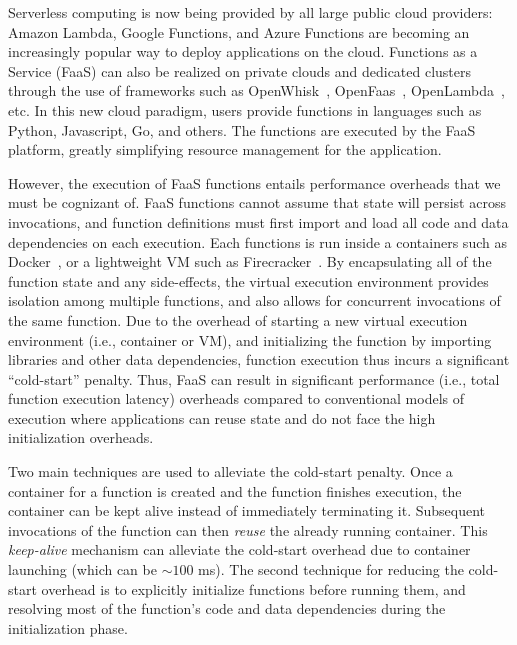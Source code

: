 
Serverless computing is now being provided by all large public cloud providers: Amazon Lambda, Google Functions, and Azure Functions are becoming an increasingly popular way to deploy applications on the cloud.  
Functions as a Service (FaaS) can also be realized on private clouds and dedicated clusters through the use of frameworks such as OpenWhisk~\cite{openwhisk}, OpenFaas~\cite{openfaas}, OpenLambda~\cite{hendrickson2016serverless}, etc. 
%
In this new cloud paradigm, users provide functions in languages such as Python, Javascript, Go, and others. 
%
The functions are executed by the FaaS platform, greatly simplifying resource management for the application. 





However, the execution of FaaS functions entails performance overheads that we must be cognizant of. 
%
%
FaaS functions cannot assume that state will persist across invocations, and function definitions must first import and load all code and data dependencies on each execution. 
%
Each functions is run inside a containers such as Docker~\cite{docker-main}, or a lightweight VM such as Firecracker~\cite{firecracker-nsdi20}. 
By encapsulating all of the function state and any side-effects, the virtual execution environment provides isolation among multiple functions, and also allows for concurrent invocations of the same function. 
%
Due to the overhead of starting a new virtual execution environment (i.e., container or VM), and initializing the function by importing libraries and other data dependencies, function execution thus incurs a significant ``cold-start'' penalty. 
%
Thus, FaaS can result in significant performance (i.e., total function execution latency) overheads compared to conventional models of execution where applications can reuse state and do not face the high initialization overheads. 


Two main techniques are used to alleviate the cold-start penalty. 
Once a container for a function is created and the function finishes execution, the container can be kept alive instead of immediately terminating it. 
Subsequent invocations of the function can then \emph{reuse} the already running container.
This \emph{keep-alive} mechanism can alleviate the cold-start overhead due to container launching (which can be $\sim 100$ ms). %
The second technique for reducing the cold-start overhead is to explicitly initialize functions before running them, and resolving most of the function's code and data dependencies during the initialization phase. 

